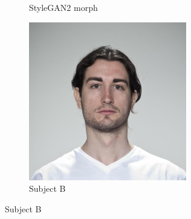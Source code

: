 \documentclass[12pt]{article}
\begin{document}
\begin{figure}[t]
\begin{subfigure}{0.19\textwidth}
        \caption{StyleGAN2 morph}
        \label{morph_comp_4}
    \end{subfigure}
    \begin{subfigure}{0.19\textwidth}
        \centering
        \includegraphics[width=\textwidth]{morph_example_A.png}
        \caption{Subject B}
        \label{morph_comp_5}
    \end{subfigure}


\end{figure}
\end{document}
